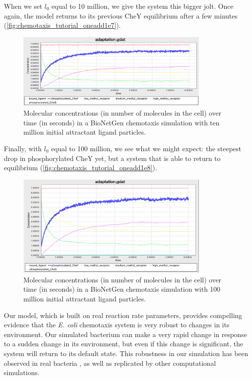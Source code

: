 When we set $l_0$ equal to 10 million, we give the system this bigger jolt. Once again, the model returns to its previous CheY equilibrium after a few minutes (\autoref{fig:chemotaxis_tutorial_oneadd1e7}).

\begin{figure}[h]
\centering
\mySfFamily
\includegraphics[width = 0.85\textwidth]{../images/chemotaxis_tutorial_oneadd1e7.png}
\caption{Molecular concentrations (in number of molecules in the cell) over time (in seconds) in a BioNetGen chemotaxis simulation with ten million initial attractant ligand particles.}
\label{fig:chemotaxis_tutorial_oneadd1e7}
\end{figure}

Finally, with $l_0$ equal to 100 million, we see what we might expect: the steepest drop in phosphorylated CheY yet, but a system that is able to return to equilibrium (\autoref{fig:chemotaxis_tutorial_oneadd1e8}).

\begin{figure}[h]
\centering
\mySfFamily
\includegraphics[width = 0.85\textwidth]{../images/chemotaxis_tutorial_oneadd1e8.png}
\caption{Molecular concentrations (in number of molecules in the cell) over time (in seconds) in a BioNetGen chemotaxis simulation with 100 million initial attractant ligand particles.}
\label{fig:chemotaxis_tutorial_oneadd1e8}
\end{figure}

Our model, which is built on real reaction rate parameters, provides compelling evidence that the \textit{E. coli} chemotaxis system is very robust to changes in its environment. Our simulated bacterium can make a very rapid change in response to a sudden change in its environment, but even if this change is significant, the system will return to its default state. This robustness in our simulation has been observed in real bacteria , as well as replicated by other computational simulations.

